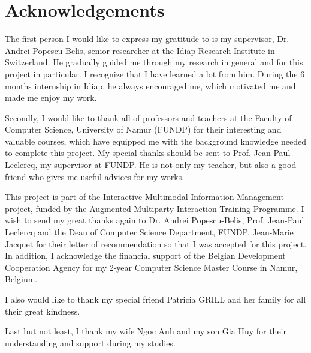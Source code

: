 


\chapter*{Acknowledgements}      %
\small

The first person I would like to express my gratitude to is my supervisor, Dr. Andrei Popescu-Belis, senior researcher at the Idiap Research Institute in Switzerland. He gradually guided me through my research in general and for this project in particular. I recognize that I have learned a lot from him. During the 6 months internship in Idiap, he always encouraged me, which motivated me and made me enjoy my work. 

Secondly, I would like to thank all of professors and teachers at the Faculty of Computer Science, University of Namur (FUNDP) for their interesting and valuable courses, which have equipped me with the background knowledge needed to complete this project. My special thanks should be sent to Prof. Jean-Paul Leclercq, my supervisor at FUNDP. He is not only my teacher, but also a good friend who gives me useful advices for my works. 

This project is part of the Interactive Multimodal Information Management project, funded by the Augmented Multiparty Interaction Training Programme. I wish to send my great thanks again to Dr. Andrei Popescu-Belis, Prof. Jean-Paul Leclercq and the Dean of Computer Science Department, FUNDP, Jean-Marie Jacquet for their letter of recommendation so that I was accepted for this project. In addition, I acknowledge the financial support of the Belgian Development Cooperation Agency for my 2-year Computer Science Master Course in Namur, Belgium.

I also would like to thank my special friend Patricia GRILL and her family for all their great kindness.

Last but not least, I thank my wife Ngoc Anh and my son Gia Huy for their understanding and support during my studies. %

\normalsize



